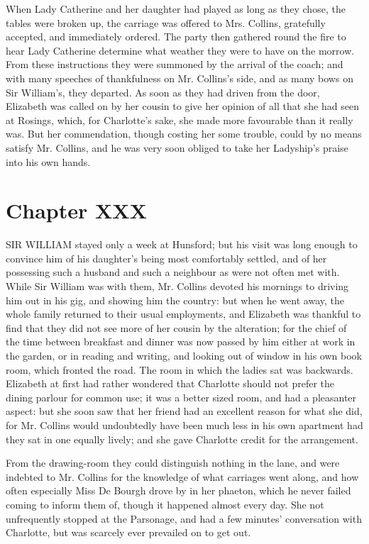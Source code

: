 \documentclass[12pt,openright]{book}
\begin{document}
When Lady Catherine and her daughter had played as long as they chose, the tables were broken up, the carriage was offered to Mrs. Collins, gratefully accepted, and immediately ordered. The party then gathered round the fire to hear Lady Catherine determine what weather they were to have on the morrow. From these instructions they were summoned by the arrival of the coach; and with many speeches of thankfulness on Mr. Collins’s side, and as many bows on Sir William’s, they departed. As soon as they had driven from the door, Elizabeth was called on by her cousin to give her opinion of all that she had seen at Rosings, which, for Charlotte’s sake, she made more favourable than it really was. But her commendation, though costing her some trouble, could by no means satisfy Mr. Collins, and he was very soon obliged to take her Ladyship’s praise into his own hands.

\chapter{Chapter XXX}

\noindent  SIR WILLIAM stayed only a week at Hunsford; but his visit was long enough to convince him of his daughter’s being most comfortably settled, and of her possessing such a husband and such a neighbour as were not often met with. While Sir William was with them, Mr. Collins devoted his mornings to driving him out in his gig, and showing him the country: but when he went away, the whole family returned to their usual employments, and Elizabeth was thankful to find that they did not see more of her cousin by the alteration; for the chief of the time between breakfast and dinner was now passed by him either at work in the garden, or in reading and writing, and looking out of window in his own book room, which fronted the road. The room in which the ladies sat was backwards. Elizabeth at first had rather wondered that Charlotte should not prefer the dining parlour for common use; it was a better sized room, and had a pleasanter aspect: but she soon saw that her friend had an excellent reason for what she did, for Mr. Collins would undoubtedly have been much less in his own apartment had they sat in one equally lively; and she gave Charlotte credit for the arrangement.

From the drawing-room they could distinguish nothing in the lane, and were indebted to Mr. Collins for the knowledge of what carriages went along, and how often especially Miss De Bourgh drove by in her phaeton, which he never failed coming to inform them of, though it happened almost every day. She not unfrequently stopped at the Parsonage, and had a few minutes’ conversation with Charlotte, but was scarcely ever prevailed on to get out.
\end{document}
